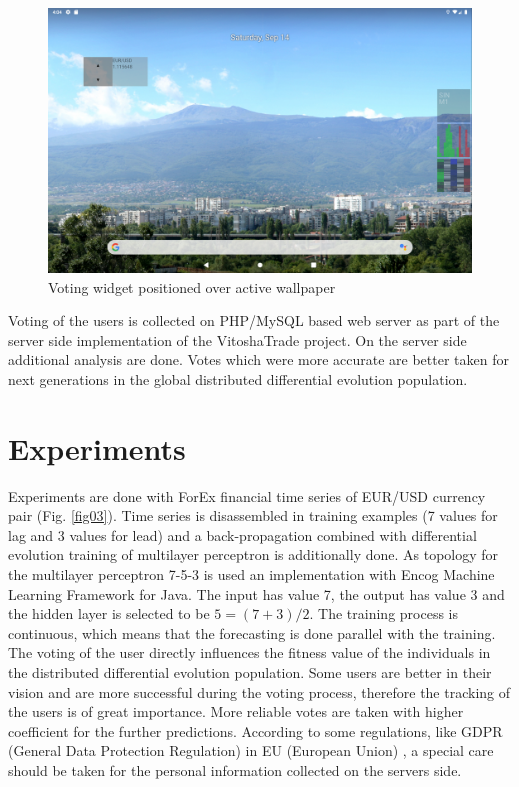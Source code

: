 \documentclass[runningheads]{llncs}
\begin{document}
\begin{figure}
\includegraphics[width=1.0\textwidth]{fig04a.png}
\centering
\caption{Voting widget positioned over active wallpaper} \label{fig04}
\end{figure}
\FloatBarrier

Voting of the users is collected on PHP/MySQL based web server \cite{tomov01} as part of the server side implementation of the VitoshaTrade project. On the server side additional analysis are done. Votes which were more accurate are better taken for next generations in the global distributed differential evolution population. 

\section{Experiments} \label{Experiments}

Experiments are done with ForEx financial time series of EUR/USD currency pair (Fig. \ref{fig03}). Time series is disassembled in training examples (7 values for lag and 3 values for lead) and a back-propagation combined with differential evolution training of multilayer perceptron is additionally done. As topology for the multilayer perceptron 7-5-3 is used an implementation with Encog Machine Learning Framework \cite{heaton01} for Java. The input has value 7, the output has value 3 and the hidden layer is selected to be $5 = (7 + 3) / 2$. The training process is continuous, which means that the forecasting is done parallel with the training. The voting of the user directly influences the fitness value of the individuals in the distributed differential evolution population. Some users are better in their vision and are more successful during the voting process, therefore the tracking of the users is of great importance. More reliable votes are taken with higher coefficient for the further predictions. According to some regulations, like GDPR (General Data Protection Regulation) in EU (European Union) \cite{hristov01}, a special care should be taken for the personal information collected on the servers side. 
\end{document}
